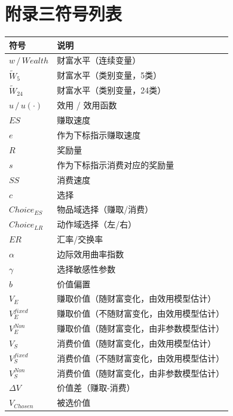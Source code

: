 \chapter*{附录三\quad 符号列表}\label{chap:app3}
\begin{table}[H]
    \centering
    \setlength{\tabcolsep}{6pt}
    \renewcommand{\arraystretch}{1.15}
    \begin{tabularx}{\textwidth}{p{}X}
        \toprule
        \textbf{符号} & \textbf{说明} \\
        \midrule
        $w\, /\,Wealth$ & 财富水平（连续变量）\\
        $\tilde{W}_5$ & 财富水平（类别变量，5类）\\
        $\tilde{W}_{24}$ & 财富水平（类别变量，24类）\\
        $u\, /\,u(\cdot)$ & 效用 / 效用函数\\
        $ES$ & 赚取速度\\
        $e$ & 作为下标指示赚取速度\\
        $R$ & 奖励量\\
        $s$ & 作为下标指示消费对应的奖励量\\
        $SS$ & 消费速度\\
        $c$ & 选择\\
        $Choice_{ES}$ & 物品域选择（赚取/消费）\\
        $Choice_{LR}$ & 动作域选择（左/右）\\
        $ER$ & 汇率/交换率\\
        $\alpha$ & 边际效用曲率指数\\
        $\gamma$ & 选择敏感性参数\\
        $b$ & 价值偏置\\
        $V_E$ & 赚取价值（随财富变化，由效用模型估计）\\
        $V_E^{fixed}$ & 赚取价值（不随财富变化，由效用模型估计）\\
        $V_E^{Non}$ & 赚取价值（随财富变化，由非参数模型估计）\\
        $V_S$ & 消费价值（随财富变化，由效用模型估计）\\
        $V_S^{fixed}$ & 消费价值（不随财富变化，由效用模型估计）\\
        $V_S^{Non}$ & 消费价值（随财富变化，由非参数模型估计）\\
        $\Delta V$ & 价值差（赚取-消费）\\
        $V_{Chosen}$ & 被选价值\\
        \bottomrule
    \end{tabularx}
\end{table}

